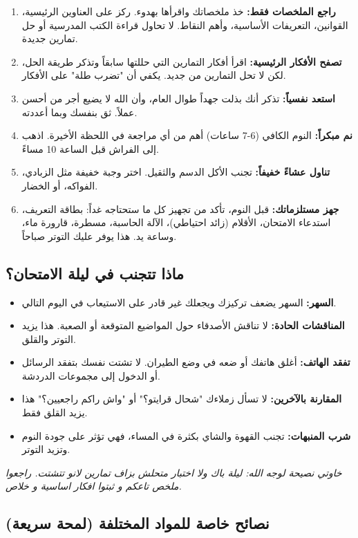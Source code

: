 \documentclass[12pt,a4paper]{book}
\newcommand{\quoteAr}[1]{%
	\begin{myquote}
		\itshape #1
	\end{myquote}
}
\begin{document}
\begin{enumerate}
	\item \textbf{راجع الملخصات فقط:} خذ ملخصاتك واقرأها بهدوء. ركز على العناوين الرئيسية، القوانين، التعريفات الأساسية، وأهم النقاط. لا تحاول قراءة الكتب المدرسية أو حل تمارين جديدة.
	\item \textbf{تصفح الأفكار الرئيسية:} اقرأ أفكار التمارين التي حللتها سابقاً وتذكر طريقة الحل، لكن لا تحل التمارين من جديد. يكفي أن "تضرب طلة" على الأفكار.
	\item \textbf{استعد نفسياً:} تذكر أنك بذلت جهداً طوال العام، وأن الله لا يضيع أجر من أحسن عملاً. ثق بنفسك وبما أعددته.
	\item \textbf{نم مبكراً:} النوم الكافي (6-7 ساعات) أهم من أي مراجعة في اللحظة الأخيرة. اذهب إلى الفراش قبل الساعة 10 مساءً.
	\item \textbf{تناول عشاءً خفيفاً:} تجنب الأكل الدسم والثقيل. اختر وجبة خفيفة مثل الزبادي، الفواكه، أو الخضار.
	\item \textbf{جهز مستلزماتك:} قبل النوم، تأكد من تجهيز كل ما ستحتاجه غداً: بطاقة التعريف، استدعاء الامتحان، الأقلام (زائد احتياطي)، الآلة الحاسبة، مسطرة، قارورة ماء، وساعة يد. هذا يوفر عليك التوتر صباحاً.
\end{enumerate}

\subsection{ماذا تتجنب في ليلة الامتحان؟}

\begin{itemize}
	\item \textbf{السهر:} السهر يضعف تركيزك ويجعلك غير قادر على الاستيعاب في اليوم التالي.
	\item \textbf{المناقشات الحادة:} لا تناقش الأصدقاء حول المواضيع المتوقعة أو الصعبة. هذا يزيد التوتر والقلق.
	\item \textbf{تفقد الهاتف:} أغلق هاتفك أو ضعه في وضع الطيران. لا تشتت نفسك بتفقد الرسائل أو الدخول إلى مجموعات الدردشة.
	\item \textbf{المقارنة بالآخرين:} لا تسأل زملاءك "شحال قرايتو؟" أو "واش راكم راجعيين؟" هذا يزيد القلق فقط.
	\item \textbf{شرب المنبهات:} تجنب القهوة والشاي بكثرة في المساء، فهي تؤثر على جودة النوم وتزيد التوتر.
\end{itemize}

\quoteAr{خاوتي نصيحة لوجه الله: ليلة باك ولا اختبار متحلش بزاف تمارين لانو تتشتت. راجعوا ملخص تاعكم و ثبتوا افكار اساسية و خلاص.}

\subsection{نصائح خاصة للمواد المختلفة (لمحة سريعة)}
\label{sec:random-tips18}
\end{document}
